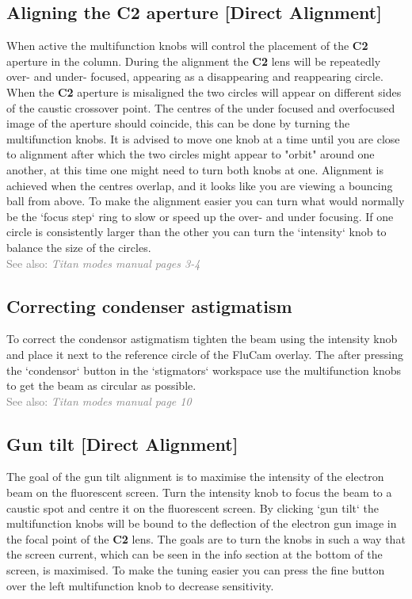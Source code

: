 \documentclass[a4paper]{scrartcl}
\begin{document}
\subsection*{Aligning the \textbf{C2} aperture [Direct Alignment]}
When active the multifunction knobs will control the placement of the \textbf{C2} aperture in the column. During the alignment the \textbf{C2} lens will be repeatedly over- and under- focused, appearing as a disappearing and reappearing circle. When the \textbf{C2} aperture is misaligned the two circles will appear on different sides of the caustic crossover point. The centres of the under focused and overfocused image of the aperture should coincide, this can be done by turning the multifunction knobs. It is advised to move one knob at a time until you are close to alignment after which the two circles might appear to "orbit" around one another, at this time one might need to turn both knobs at one. Alignment is achieved when the centres overlap, and it looks like you are viewing a bouncing ball from above. To make the alignment easier you can turn what would normally be the `focus step` ring to slow or speed up the over- and under focusing. If one circle is consistently larger than the other you can turn the `intensity` knob to balance the size of the circles.\\
\textcolor{gray}{See also: \textit{Titan modes manual pages 3-4}}

\subsection*{Correcting condenser astigmatism}
To correct the condensor astigmatism tighten the beam using the intensity knob and place it next to the reference circle of the FluCam overlay. The after pressing the `condensor` button in the `stigmators` workspace use the multifunction knobs to get the beam as circular as possible.\\
\textcolor{gray}{See also: \textit{Titan modes manual page 10}}

\subsection*{Gun tilt [Direct Alignment]}
The goal of the gun tilt alignment is to maximise the intensity of the electron beam on the fluorescent screen. Turn the intensity knob to focus the beam to a caustic spot and centre it on the fluorescent screen. By clicking `gun tilt` the multifunction knobs will be bound to the deflection of the electron gun image in the focal point of the \textbf{C2} lens. The goals are to turn the knobs in such a way that the screen current, which can be seen in the info section at the bottom of the screen, is maximised. To make the tuning easier you can press the fine button over the left multifunction knob to decrease sensitivity.
\end{document}
